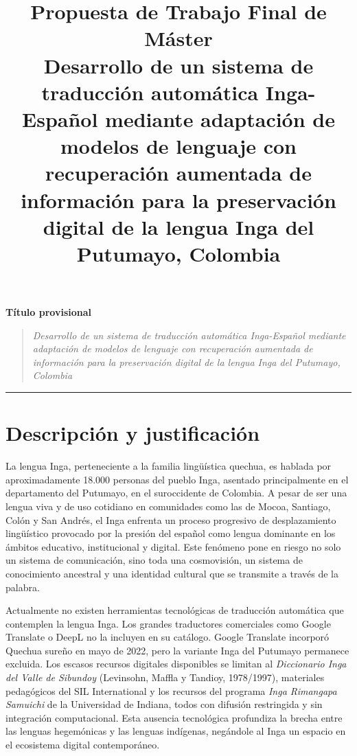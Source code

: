 \documentclass[12pt,a4paper]{article}
\title{
    \vspace{-1cm}
    \textbf{Propuesta de Trabajo Final de Máster}\\[0.5cm]
    \large Desarrollo de un sistema de traducción automática Inga-Español mediante adaptación de modelos de lenguaje con recuperación aumentada de información para la preservación digital de la lengua Inga del Putumayo, Colombia
}
\author{}
\date{}
\begin{document}
\maketitle
\thispagestyle{empty}

\vspace{1cm}

\begin{center}
\textbf{Título provisional}
\end{center}

\begin{quote}
\textit{Desarrollo de un sistema de traducción automática Inga-Español mediante adaptación de modelos de lenguaje con recuperación aumentada de información para la preservación digital de la lengua Inga del Putumayo, Colombia}
\end{quote}

\vspace{1cm}
\hrule
\vspace{1cm}

\section{Descripción y justificación}

La lengua Inga, perteneciente a la familia lingüística quechua, es hablada por aproximadamente 18.000 personas del pueblo Inga, asentado principalmente en el departamento del Putumayo, en el suroccidente de Colombia. A pesar de ser una lengua viva y de uso cotidiano en comunidades como las de Mocoa, Santiago, Colón y San Andrés, el Inga enfrenta un proceso progresivo de desplazamiento lingüístico provocado por la presión del español como lengua dominante en los ámbitos educativo, institucional y digital. Este fenómeno pone en riesgo no solo un sistema de comunicación, sino toda una cosmovisión, un sistema de conocimiento ancestral y una identidad cultural que se transmite a través de la palabra.

Actualmente no existen herramientas tecnológicas de traducción automática que contemplen la lengua Inga. Los grandes traductores comerciales como Google Translate o DeepL no la incluyen en su catálogo. Google Translate incorporó Quechua sureño en mayo de 2022, pero la variante Inga del Putumayo permanece excluida. Los escasos recursos digitales disponibles se limitan al \textit{Diccionario Inga del Valle de Sibundoy} (Levinsohn, Maffla y Tandioy, 1978/1997), materiales pedagógicos del SIL International y los recursos del programa \textit{Inga Rimangapa Samuichi} de la Universidad de Indiana, todos con difusión restringida y sin integración computacional. Esta ausencia tecnológica profundiza la brecha entre las lenguas hegemónicas y las lenguas indígenas, negándole al Inga un espacio en el ecosistema digital contemporáneo.
\end{document}
